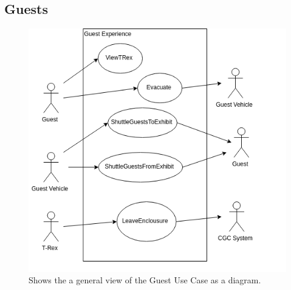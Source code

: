 \documentclass[12pt]{article}
\begin{document}
\subsection{Guests}
\begin{figure}[H]
    \centerline{\includegraphics[scale=.30]{Use_Cases__Guest.png}}
    \caption{Shows the a general view of the Guest Use Case as a diagram.}
    \label{fig:usecaseguest}
\end{figure}
\small
\end{document}
